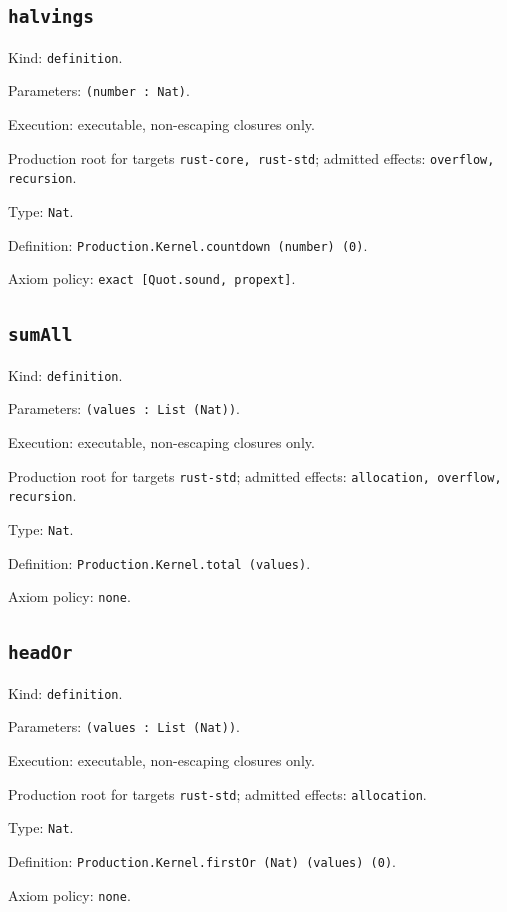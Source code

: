 \documentclass[11pt]{article}
\begin{document}
\subsection*{\texttt{halvings}}
\noindent Kind: \texttt{definition}.\par
\noindent Parameters: \texttt{(number : Nat)}.\par
\noindent Execution: executable, non-escaping closures only.\par
\noindent Production root for targets \texttt{rust-core, rust-std}; admitted effects: \texttt{overflow, recursion}.\par
\noindent Type: \texttt{Nat}.\par
\noindent Definition: \texttt{Production.Kernel.countdown (number) (0)}.\par
\noindent Axiom policy: \texttt{exact [Quot.sound, propext]}.\par
\subsection*{\texttt{sumAll}}
\noindent Kind: \texttt{definition}.\par
\noindent Parameters: \texttt{(values : List (Nat))}.\par
\noindent Execution: executable, non-escaping closures only.\par
\noindent Production root for targets \texttt{rust-std}; admitted effects: \texttt{allocation, overflow, recursion}.\par
\noindent Type: \texttt{Nat}.\par
\noindent Definition: \texttt{Production.Kernel.total (values)}.\par
\noindent Axiom policy: \texttt{none}.\par
\subsection*{\texttt{headOr}}
\noindent Kind: \texttt{definition}.\par
\noindent Parameters: \texttt{(values : List (Nat))}.\par
\noindent Execution: executable, non-escaping closures only.\par
\noindent Production root for targets \texttt{rust-std}; admitted effects: \texttt{allocation}.\par
\noindent Type: \texttt{Nat}.\par
\noindent Definition: \texttt{Production.Kernel.firstOr (Nat) (values) (0)}.\par
\noindent Axiom policy: \texttt{none}.\par
\end{document}
